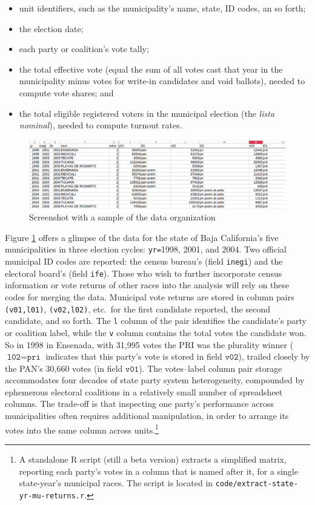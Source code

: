 \documentclass[letter,12pt]{article}
\newcommand{\emm}[1]{\todo[color=red!15, inline]{\textbf{Eric:} #1}}
\begin{document}
\begin{itemize}
\item unit identifiers, such as the municipality's name, state, ID codes, an so forth;
\item the election date;
\item each party or coalition's vote tally;
\item the total effective vote (equal the sum of all votes cast that year in the municipality minus votes for write-in candidates and void ballots), needed to compute vote shares; and
\item the total eligible registered voters in the municipal election (the \emph{lista nominal}), needed to compute turnout rates.
\end{itemize}

\begin{figure}
  \centering
  \includegraphics[width=\columnwidth]{pics/eg-spreadsheet-columns.png}
  \caption{Screenshot with a sample of the data organization}\label{F:scrn}
\end{figure}  

Figure \ref{F:scrn} offers a glimpse of the data for the state of Baja California's five municipalities in three election cycles: \verb|yr=|1998, 2001, and 2004. Two official municipal ID codes are reported: the census bureau's (field \verb|inegi|) and the electoral board's (field \verb|ife|). Those who wish to further incorporate census information or vote returns of other races into the analysis will rely on these codes for merging the data. Municipal vote returns are stored in column pairs \verb|(v01,l01)|, \verb|(v02,l02)|, etc.\ for the first candidate reported, the second candidate, and so forth. The \verb|l| column of the pair identifies the candidate's party or coalition label, while the \verb|v| column contains the total votes the candidate won. So in 1998 in Ensenada, with 31,995 votes the PRI was the plurality winner ($\texttt{l02} = \texttt{pri}$ indicates that this party's vote is stored in field $\texttt{v02}$), trailed closely by the PAN's 30,660 votes (in field $\texttt{v01}$). The votes--label column pair storage accommodates four decades of state party system heterogeneity, compounded by ephemerous electoral coalitions in a relatively small number of spreadsheet columns. The trade-off is that inspecting one party's performance across municipalities often requires additional manipulation, in order to arrange its votes into the same column across units.\footnote{A standalone R script (still a beta version) extracts a simplified matrix, reporting each party's votes in a column that is named after it, for a single state-year's municipal races. The script is located in \verb|code/extract-state-yr-mu-returns.r|.} %
\end{document}
